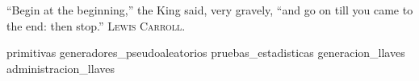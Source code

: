 %
%
%

\newpage
{}
{}
{
  \epigrafe
  {%
    ``Begin at the beginning,'' the King said, very gravely, ``and go on till
    you came to the end: then stop.''%
  }
  {%
    \textsc{Lewis Carroll}.%
  }
}

\begin{appendices}
  {primitivas}
  {generadores_pseudoaleatorios}
  {pruebas_estadisticas}
  {generacion_llaves}
  {administracion_llaves}
\end{appendices}

\newpage
